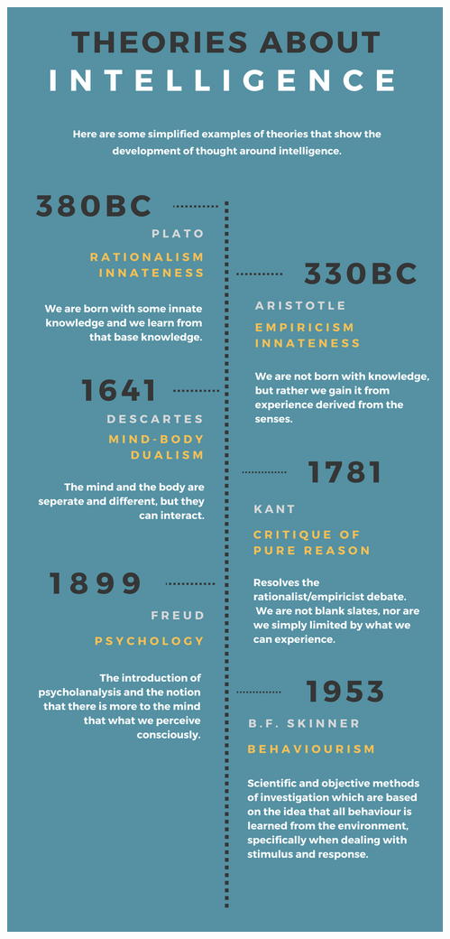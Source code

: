 \documentclass[11pt]{article}
\begin{document}
\includegraphics[width=\textwidth,height=\textheight,keepaspectratio]{img}
\end{document}

